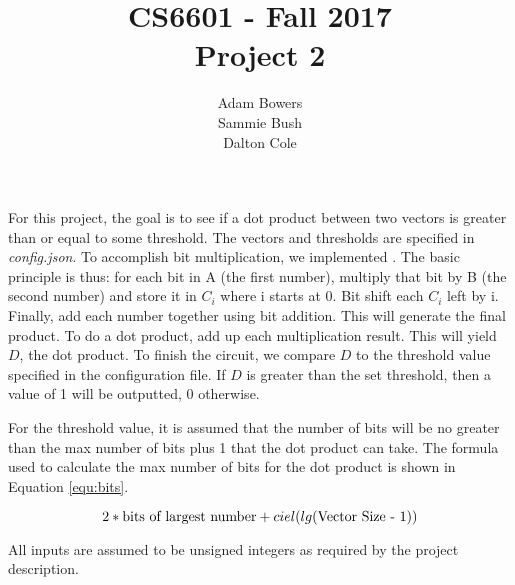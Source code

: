 \documentclass[times]{article}
\begin{document}
	\title{CS6601  - Fall 2017 \\ Project 2}
	\author{Adam Bowers \\ Sammie Bush \\ Dalton Cole}
	\date{}
	\maketitle
	
	For this project, the goal is to see if a dot product between two vectors is greater than or equal to some threshold. The vectors and thresholds are specified in \textit{config.json}. To accomplish bit multiplication, we implemented \cite{ref:mult}. The basic principle is thus: for each bit in A (the first number), multiply that bit by B (the second number) and store it in $C_i$ where i starts at 0. Bit shift each $C_i$ left by i. Finally, add each number together using bit addition. This will generate the final product. To do a dot product, add up each multiplication result. This will yield $D$, the dot product. To finish the circuit, we compare $D$ to the threshold value specified in the configuration file. If $D$ is greater than the set threshold, then a value of 1 will be outputted, 0 otherwise.

	For the threshold value, it is assumed that the number of bits will be no greater than the max number of bits plus 1 that the dot product can take. The formula used to calculate the max number of bits for the dot product is shown in Equation \ref{equ:bits}.

	\begin{equation}
		\label{equ:bits}
		2 * \textnormal{bits of largest number} + ciel(lg(\textnormal{Vector Size - 1}))
	\end{equation}

	All inputs are assumed to be unsigned integers as required by the project description.


	\medskip
	
	
\end{document}
